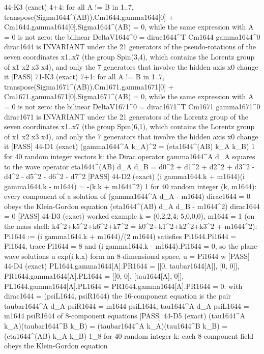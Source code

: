 \documentclass[
  10pt,
]{article}
\newenvironment{Shaded}{}{}
\newcommand{\NormalTok}[1]{#1}
\begin{document}
\begin{Shaded}
\begin{Highlighting}[]
\NormalTok{[PASS] 44{-}K3  (exact) 4+4: for all A != B in 1..7, transpose(Sigma1644\^{}(AB)).Cm1644.gamma1644[0] + Cm1644.gamma1644[0].Sigma1644\^{}(AB) = 0, while the same expression with A = 0 is not zero: the bilinear DeltaV1644\^{}0 = dirac1644\^{}T Cm1644 gamma1644\^{}0 dirac1644 is INVARIANT under the 21 generators of the pseudo{-}rotations of the seven coordinates x1..x7 (the group Spin(3,4), which contains the Lorentz group of x1 x2 x3 x4), and only the 7 generators that involve the hidden axis x0 change it}
\NormalTok{[PASS] 71{-}K3  (exact) 7+1: for all A != B in 1..7, transpose(Sigma1671\^{}(AB)).Cm1671.gamma1671[0] + Cm1671.gamma1671[0].Sigma1671\^{}(AB) = 0, while the same expression with A = 0 is not zero: the bilinear DeltaV1671\^{}0 = dirac1671\^{}T Cm1671 gamma1671\^{}0 dirac1671 is INVARIANT under the 21 generators of the Lorentz group of the seven coordinates x1..x7 (the group Spin(6,1), which contains the Lorentz group of x1 x2 x3 x4), and only the 7 generators that involve the hidden axis x0 change it}
\NormalTok{[PASS] 44{-}D1  (exact) (gamma1644\^{}A k\_A)\^{}2 = (eta1644\^{}(AB) k\_A k\_B) 1 for 40 random integer vectors k: the Dirac operator gamma1644\^{}A d\_A squares to the wave operator eta1644\^{}(AB) d\_A d\_B = d0\^{}2 + d1\^{}2 + d2\^{}2 + d3\^{}2 {-} d4\^{}2 {-} d5\^{}2 {-} d6\^{}2 {-} d7\^{}2}
\NormalTok{[PASS] 44{-}D2  (exact) (i gamma1644.k + m1644)(i gamma1644.k {-} m1644) = {-}(k.k + m1644\^{}2) 1 for 40 random integer (k, m1644): every component of a solution of (gamma1644\^{}A d\_A {-} m1644) dirac1644 = 0 obeys the Klein{-}Gordon equation (eta1644\^{}(AB) d\_A d\_B {-} m1644\^{}2) dirac1644 = 0}
\NormalTok{[PASS] 44{-}D3  (exact) worked example k = (0,2,2,4; 5,0,0,0), m1644 = 1 (on the mass shell: k4\^{}2+k5\^{}2+k6\^{}2+k7\^{}2 = k0\^{}2+k1\^{}2+k2\^{}2+k3\^{}2 + m1644\^{}2): Pi1644 := (i gamma1644.k + m1644)/(2 m1644) satisfies Pi1644.Pi1644 = Pi1644, trace Pi1644 = 8 and (i gamma1644.k {-} m1644).Pi1644 = 0, so the plane{-}wave solutions u exp(i k.x) form an 8{-}dimensional space, u = Pi1644 w}
\NormalTok{[PASS] 44{-}D4  (exact) PL1644.gamma1644[A].PR1644 = [[0, taubar1644[A]], [0, 0]], PR1644.gamma1644[A].PL1644 = [[0, 0], [tau1644[A], 0]], PL1644.gamma1644[A].PL1644 = PR1644.gamma1644[A].PR1644 = 0: with dirac1644 = (psiL1644, psiR1644) the 16{-}component equation is the pair  taubar1644\^{}A d\_A psiR1644 = m1644 psiL1644,  tau1644\^{}A d\_A psiL1644 = m1644 psiR1644  of 8{-}component equations}
\NormalTok{[PASS] 44{-}D5  (exact) (tau1644\^{}A k\_A)(taubar1644\^{}B k\_B) = (taubar1644\^{}A k\_A)(tau1644\^{}B k\_B) = (eta1644\^{}(AB) k\_A k\_B) 1\_8 for 40 random integer k: each 8{-}component field obeys the Klein{-}Gordon equation}

\end{Highlighting}
\end{Shaded}
\end{document}
